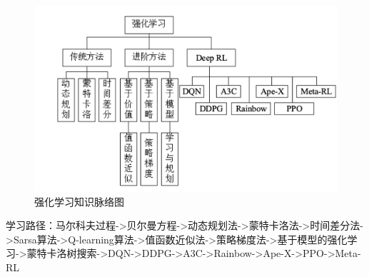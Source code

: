 \documentclass[lang=cn,11pt,a4paper]{elegant_template}
\begin{document}
\begin{figure}[htbp]
  \centering
  \includegraphics[width=1\textwidth]{image/rl_1.png}
  \caption{强化学习知识脉络图}
\end{figure}
学习路径：马尔科夫过程->贝尔曼方程->动态规划法->蒙特卡洛法->时间差分法->Sarsa算法->Q-learning算法->值函数近似法->策略梯度法->基于模型的强化学习->蒙特卡洛树搜索->DQN->DDPG->A3C->Rainbow->Ape-X->PPO->Meta-RL
\end{document}
